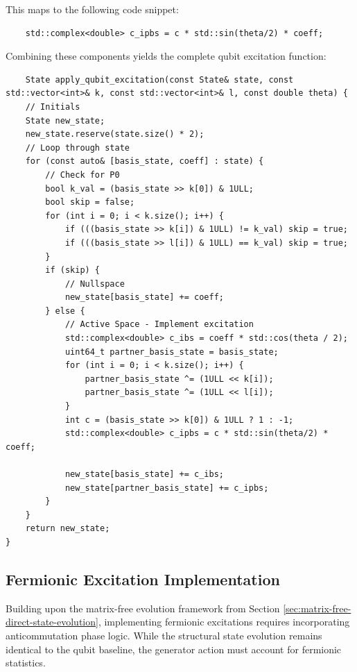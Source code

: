 This maps to the following code snippet:

\begin{verbatim}
    std::complex<double> c_ipbs = c * std::sin(theta/2) * coeff;
\end{verbatim}

Combining these components yields the complete qubit excitation function:

\begin{verbatim}
    State apply_qubit_excitation(const State& state, const std::vector<int>& k, const std::vector<int>& l, const double theta) {
    // Initials
    State new_state;
    new_state.reserve(state.size() * 2);
    // Loop through state
    for (const auto& [basis_state, coeff] : state) {
        // Check for P0
        bool k_val = (basis_state >> k[0]) & 1ULL;
        bool skip = false;
        for (int i = 0; i < k.size(); i++) {
            if (((basis_state >> k[i]) & 1ULL) != k_val) skip = true;
            if (((basis_state >> l[i]) & 1ULL) == k_val) skip = true;
        }
        if (skip) {
            // Nullspace
            new_state[basis_state] += coeff;
        } else {
            // Active Space - Implement excitation
            std::complex<double> c_ibs = coeff * std::cos(theta / 2);
            uint64_t partner_basis_state = basis_state;
            for (int i = 0; i < k.size(); i++) {
                partner_basis_state ^= (1ULL << k[i]);
                partner_basis_state ^= (1ULL << l[i]);
            }
            int c = (basis_state >> k[0]) & 1ULL ? 1 : -1;
            std::complex<double> c_ipbs = c * std::sin(theta/2) * coeff;

            new_state[basis_state] += c_ibs;
            new_state[partner_basis_state] += c_ipbs;
        }
    }
    return new_state;
}
\end{verbatim}

\subsection{Fermionic Excitation Implementation}\label{subsec:fermionic-excitation-implementation}
Building upon the matrix-free evolution framework from Section \ref{sec:matrix-free-direct-state-evolution}, implementing fermionic excitations requires incorporating anticommutation phase logic. While the structural state evolution remains identical to the qubit baseline, the generator action must account for fermionic statistics.


